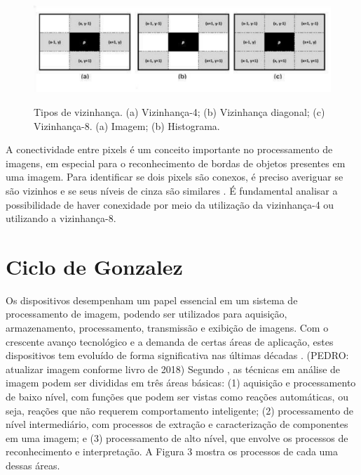  \begin{figure}[h]
	\centering
	\includegraphics[width=1.0\textwidth]{Imagens/imagem3} %
	\caption[Texto que vai aparecer na lista de fig.]{Tipos de vizinhança. (a) Vizinhança-4; (b) Vizinhança diagonal; (c) Vizinhança-8.  (a) Imagem; (b) Histograma.}
	\label{fig:tux_laplace}
\end{figure}

A conectividade entre pixels é um conceito importante no processamento de imagens, em especial para o reconhecimento de bordas de objetos presentes em uma imagem. Para identificar se dois pixels são conexos, é preciso averiguar se são vizinhos e se seus níveis de cinza são similares . É fundamental analisar a possibilidade de haver conexidade por meio da utilização da vizinhança-4 ou utilizando a vizinhança-8.




\section{Ciclo de Gonzalez}
Os dispositivos desempenham um papel essencial em um sistema de processamento de imagem, podendo ser utilizados para aquisição, armazenamento, processamento, transmissão e exibição de imagens. Com o crescente avanço tecnológico e a demanda de certas áreas de aplicação, estes dispositivos tem evoluído de forma significativa nas últimas décadas \cite{PEDRINI2008}.
(PEDRO: atualizar imagem conforme livro de 2018)
Segundo , as técnicas em análise de imagem podem ser divididas em três áreas básicas: (1) aquisição e processamento de baixo nível, com funções que podem ser vistas como reações automáticas, ou seja, reações que não requerem comportamento inteligente; (2) processamento de nível intermediário, com processos de extração e caracterização de componentes em uma imagem; e (3) processamento de alto nível, que envolve os processos de reconhecimento e interpretação. A Figura 3 mostra os processos de cada uma dessas áreas.



